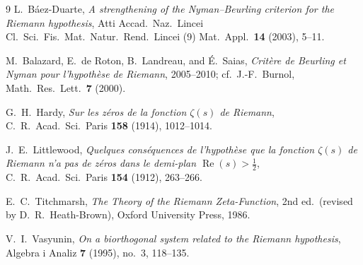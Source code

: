 \documentclass[11pt,a4paper]{article}
\theoremstyle{definition}
\begin{document}
\begin{thebibliography}{9}
L.~B\'aez-Duarte, \emph{A strengthening of the Nyman--Beurling criterion for the Riemann hypothesis}, Atti Accad.\ Naz.\ Lincei Cl.\ Sci.\ Fis.\ Mat.\ Natur.\ Rend.\ Lincei (9) Mat.\ Appl.\ \textbf{14} (2003), 5--11.

M.~Balazard, E.~de Roton, B.~Landreau, and \'E.~Saias, \emph{Crit\`ere de Beurling et Nyman pour l'hypoth\`ese de Riemann}, 2005--2010; cf.\ J.-F.~Burnol, Math.\ Res.\ Lett.\ \textbf{7} (2000).

G.~H.~Hardy, \emph{Sur les z\'eros de la fonction $\zeta(s)$ de Riemann}, C.\ R.\ Acad.\ Sci.\ Paris \textbf{158} (1914), 1012--1014.

J.~E.~Littlewood, \emph{Quelques cons\'equences de l'hypoth\`ese que la fonction $\zeta(s)$ de Riemann n'a pas de z\'eros dans le demi-plan $\operatorname{Re}(s) > \frac{1}{2}$}, C.\ R.\ Acad.\ Sci.\ Paris \textbf{154} (1912), 263--266.

E.~C.~Titchmarsh, \emph{The Theory of the Riemann Zeta-Function}, 2nd ed.\ (revised by D.~R.~Heath-Brown), Oxford University Press, 1986.

V.~I.~Vasyunin, \emph{On a biorthogonal system related to the Riemann hypothesis}, Algebra i Analiz \textbf{7} (1995), no.~3, 118--135.
\end{thebibliography}
\end{document}

